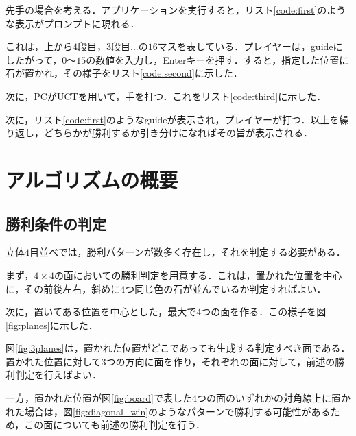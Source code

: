 \documentclass{jarticle}
\begin{document}
先手の場合を考える．アプリケーションを実行すると，リスト\ref{code:first}のような表示がプロンプトに現れる．
\lstset{style=customplain}


これは，上から$4$段目，$3$段目...の$16$マスを表している．プレイヤーは，guideにしたがって，$0$〜$15$の数値を入力し，Enterキーを押す．すると，指定した位置に石が置かれ，その様子をリスト\ref{code:second}に示した．\lstset{style=customplain}


次に，PCがUCTを用いて，手を打つ．これをリスト\ref{code:third}に示した．
\lstset{style=customplain}


次に，リスト\ref{code:first}のようなguideが表示され，プレイヤーが打つ．以上を繰り返し，どちらかが勝利するか引き分けになればその旨が表示される．

\section{アルゴリズムの概要}

\subsection{勝利条件の判定}
立体$4$目並べでは，勝利パターンが数多く存在し，それを判定する必要がある．

まず，$4 \times 4$の面においての勝利判定を用意する．これは，置かれた位置を中心に，その前後左右，斜めに$4$つ同じ色の石が並んでいるか判定すればよい．

次に，置いてある位置を中心とした，最大で$4$つの面を作る．この様子を図\ref{fig:planes}に示した．

図\ref{fig:3planes}は，置かれた位置がどこであっても生成する判定すべき面である．置かれた位置に対して$3$つの方向に面を作り，それぞれの面に対して，前述の勝利判定を行えばよい．

一方，置かれた位置が図\ref{fig:board}で表した$4$つの面のいずれかの対角線上に置かれた場合は，図\ref{fig:diagonal_win}のようなパターンで勝利する可能性があるため，この面についても前述の勝利判定を行う．
\end{document}
